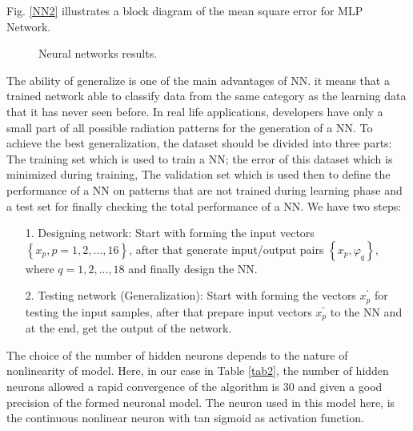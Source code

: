 \documentclass[conference]{IEEEtran}
\begin{document}
Fig. \ref{NN2} illustrates a block diagram of the mean square error for MLP Network.
\begin{figure} [!ht] 
\end{figure}

\begin{figure*}[!ht] 
    \centering 
    \caption{Neural networks results.} 
    \label{NN3_4_5} 
\end{figure*}

The ability of generalize is one of the main advantages of NN. it means that a trained network able to classify data from the same category as the learning data that it has never seen before. In real life applications, developers have only a small part of all possible radiation patterns for the generation of a NN. To achieve the best generalization, the dataset should be divided into three parts: The training set which is used to train a NN; the error of this dataset which is minimized during training, The validation set which is used then to define the performance of a NN on patterns that are not trained during learning phase and a test set for finally checking the total performance of a NN. We have two steps:
\begin{enumerate}
\item [1.] Designing network: Start with forming the input vectors $\left\{ {x_p ,p = 1,2,...,16} \right\}$, after that generate input/output pairs $\left\{ {x_p ,\varphi _q } \right\}$, where $q = 1,2,...,18$ and finally design the NN.
\item [2.] Testing network (Generalization): Start with forming the vectors $x_p^{'}$ for testing the input samples, after that prepare input vectors $x_p^{'}$ to the NN and at the end, get the output of the network.
\end{enumerate}

The choice of the number of hidden neurons depends to the nature of nonlinearity of model. Here, in our case in Table \ref{tab2}, the number of hidden neurons allowed a rapid convergence of the algorithm is $30$ and given a good precision of the formed neuronal model. The neuron used in this model here, is the continuous nonlinear neuron with tan sigmoid as activation function.
\end{document}
